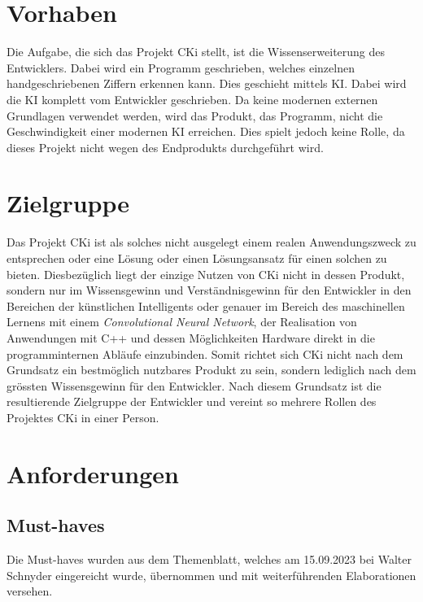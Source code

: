 \section{Vorhaben}
\label{sec:AnalyseAufgabenstellung}
Die Aufgabe, die sich das Projekt CKi stellt, ist die Wissenserweiterung des Entwicklers. Dabei wird ein Programm geschrieben, welches einzelnen handgeschriebenen Ziffern erkennen kann. Dies geschieht mittels KI. Dabei wird die KI komplett vom Entwickler geschrieben. Da keine modernen externen Grundlagen verwendet werden, wird das Produkt, das Programm, nicht die Geschwindigkeit einer modernen KI erreichen. Dies spielt jedoch keine Rolle, da dieses Projekt nicht wegen des Endprodukts durchgeführt wird.

\section{Zielgruppe}
\label{sec:AnalyseZielgruppe}
Das Projekt CKi ist als solches nicht ausgelegt einem realen Anwendungszweck zu entsprechen oder eine Lösung oder einen Lösungsansatz für einen solchen zu bieten. Diesbezüglich liegt der einzige Nutzen von CKi nicht in dessen Produkt, sondern nur im Wissensgewinn und Verständnisgewinn für den Entwickler in den Bereichen der künstlichen Intelligents oder genauer im Bereich des maschinellen Lernens mit einem \textit{Convolutional Neural Network}, der Realisation von Anwendungen mit C++ und dessen Möglichkeiten Hardware direkt in die programminternen Abläufe einzubinden. Somit richtet sich CKi nicht nach dem Grundsatz ein bestmöglich nutzbares Produkt zu sein, sondern lediglich nach dem grössten Wissensgewinn für den Entwickler. Nach diesem Grundsatz ist die resultierende Zielgruppe der Entwickler und vereint so mehrere Rollen des Projektes CKi in einer Person.

\section{Anforderungen}
\label{sec:AnalyseAnforderungen}

\subsection{Must-haves}
\label{sec:AnalyseMustHaveS}
Die Must-haves wurden aus dem Themenblatt, welches am 15.09.2023 bei Walter Schnyder eingereicht wurde, übernommen und mit weiterführenden Elaborationen versehen.

